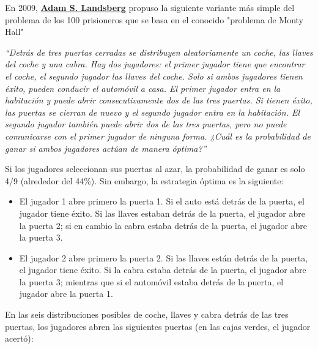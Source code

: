 En 2009, \href{https://www.researchgate.net/profile/Adam-Landsberg}{\textbf{Adam S. Landsberg}} propuso la siguiente variante más simple del problema de los 100 prisioneros que se basa en el conocido "problema de Monty Hall" \cite{landsberg2009return}

\textit{``Detrás de tres puertas cerradas se distribuyen aleatoriamente un coche, las llaves del coche y una cabra. Hay dos jugadores: el primer jugador tiene que encontrar el coche, el segundo jugador las llaves del coche. Solo si ambos jugadores tienen éxito, pueden conducir el automóvil a casa. El primer jugador entra en la habitación y puede abrir consecutivamente dos de las tres puertas. Si tienen éxito, las puertas se cierran de nuevo y el segundo jugador entra en la habitación. El segundo jugador también puede abrir dos de las tres puertas, pero no puede comunicarse con el primer jugador de ninguna forma. ¿Cuál es la probabilidad de ganar si ambos jugadores actúan de manera óptima?''}

Si los jugadores seleccionan sus puertas al azar, la probabilidad de ganar es solo 4/9 (alrededor del 44\%). Sin embargo, la estrategia óptima es la siguiente:

\begin{itemize}
    \item El jugador 1 abre primero la puerta 1. Si el auto está detrás de la puerta, el jugador tiene éxito. Si las llaves estaban detrás de la puerta, el jugador abre la puerta 2; si en cambio la cabra estaba detrás de la puerta, el jugador abre la puerta 3.
    \item El jugador 2 abre primero la puerta 2. Si las llaves están detrás de la puerta, el jugador tiene éxito. Si la cabra estaba detrás de la puerta, el jugador abre la puerta 3; mientras que si el automóvil estaba detrás de la puerta, el jugador abre la puerta 1.
\end{itemize}

En las seis distribuciones posibles de coche, llaves y cabra detrás de las tres puertas, los jugadores abren las siguientes puertas (en las cajas verdes, el jugador acertó):


